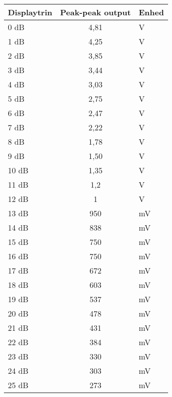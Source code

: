 \begin{table}[h]
\begin{minipage}[b]	{0.5\linewidth}
\centering
\begin{tabular}{l|c|l}
\hline\hline
Displaytrin & Peak-peak output & Enhed \\
\hline\hline
0 dB & 4,81 & V \\[4pt]
1 dB & 4,25 & V \\[4pt]
2 dB & 3,85 & V \\[4pt]
3 dB & 3,44 & V \\[4pt]
4 dB & 3,03 & V \\[4pt]
5 dB & 2,75 & V \\[4pt]
6 dB & 2,47 & V \\[4pt]
7 dB & 2,22 & V \\[4pt]
8 dB & 1,78 & V \\[4pt]
9 dB & 1,50 & V \\[4pt]
10 dB & 1,35 & V \\[4pt]
11 dB & 1,2 & V \\[4pt]
12 dB & 1 & V \\[4pt]
13 dB & 950 & mV \\[4pt]
14 dB & 838 & mV \\[4pt]
15 dB & 750 & mV \\[4pt]
16 dB & 750 & mV \\[4pt]
17 dB & 672 & mV \\[4pt]
18 dB & 603 & mV \\[4pt]
19 dB & 537 & mV \\[4pt]
20 dB & 478 & mV \\[4pt]
21 dB & 431 & mV \\[4pt]
22 dB & 384 & mV \\[4pt]
23 dB & 330 & mV \\[4pt]
24 dB & 303 & mV \\[4pt]
25 dB & 273 & mV \\[4pt]
\end{tabular}
\end{minipage}



\end{table}
